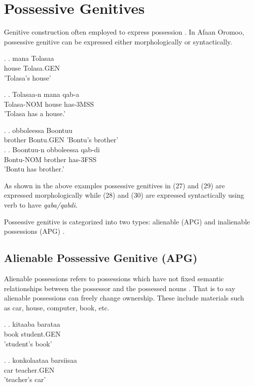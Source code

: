 \documentclass[11pt,a4paper]{article}
\begin{document}
	\section{Possessive Genitives}
	
	Genitive construction often employed to express possession \cite[68]{greenlee1950genitive}.
	In Afaan Oromoo, possessive genitive can be expressed either morphologically or syntactically. 
	
	\ex.
	\ag.
	mana Tolasaa\\
	house Tolasa.GEN\\
	'Tolasa's house'
	
	\ex.
	\ag.
	Tolasaa-n mana qab-a\\
	Tolasa-NOM house has-3MSS\\
	'Tolasa has a house.'
	
	\ex.
	\ag.
	obboleessa Boontuu\\
	brother Bontu.GEN
	'Bontu's brother'\\
		
	\ex.
	\ag.
	Boontuu-n obboleessa qab-di\\
	Bontu-NOM brother has-3FSS\\
	'Bontu has brother.'
	
	
	As shown in the above examples possessive genitives in (27) and (29) are expressed morphologically while (28) and (30) are expressed syntactically using verb to have \emph{qaba/qabdi}. 
	
	Possessive genitive is categorized into two types: alienable (APG) and inalienable possessions (APG) \cite{gebregziabher2012alienable}.
	
	\subsection{Alienable Possessive Genitive (APG)}
	
	Alienable possessions refers to possessions which have not fixed semantic relationships between the 
	possessor and the possessed nouns \cite{gebregziabher2012alienable}. That is to say alienable possessions can freely change ownership. These include materials such as car, house, computer, book, etc.
	
	\ex.
	\ag.
	kitaaba barataa\\
	book student.GEN\\
	'student's book'
	
	\ex.
	\ag.
	konkolaataa barsiisaa\\
	car teacher.GEN\\
	'teacher's car'
\end{document}
